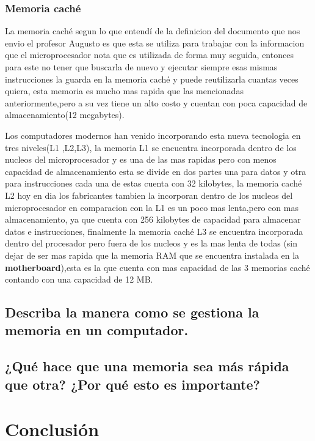 \documentclass{article}
\begin{document}
\subsubsection{Memoria caché}
La memoria caché segun lo que entendí de la definicion del documento que nos envio el profesor Augusto \cite{Augusto} es que esta se utiliza para trabajar con la informacion que el microprocesador nota que es utilizada de forma muy seguida, entonces para este no tener que buscarla de nuevo y ejecutar siempre esas mismas instrucciones la guarda en la memoria caché y puede reutilizarla cuantas veces quiera, esta memoria es mucho mas rapida que las mencionadas anteriormente,pero a su vez tiene un alto costo y cuentan con poca capacidad de almacenamiento(12 megabytes).

\vspace{0.3cm}

Los computadores modernos han venido incorporando esta nueva tecnologia en tres niveles(L1 ,L2,L3), la memoria L1 se encuentra incorporada dentro de los nucleos del microprocesador y es una de las mas rapidas pero con menos capacidad de almacenamiento esta se divide en dos partes una para datos y otra para instrucciones cada una de estas cuenta con 32 kilobytes, la memoria caché L2 hoy en dia los fabricantes tambien la incorporan dentro de los nucleos del microprocesador en comparacion con la L1 es un poco mas lenta,pero con mas almacenamiento, ya que cuenta con 256 kilobytes de capacidad para almacenar datos e instrucciones, finalmente la memoria caché L3 se encuentra incorporada dentro del procesador pero fuera de los nucleos y es la mas lenta de todas (sin dejar de ser mas rapida que la memoria RAM que se encuentra instalada en la \textbf{motherboard}),esta es la que cuenta con mas capacidad de las 3 memorias caché contando con una capacidad de 12 MB. 

\subsection{Describa la manera como se gestiona la memoria en un computador.}

\subsection{¿Qué hace que una memoria sea más rápida que otra? ¿Por qué esto es importante?}

\section{Conclusión} \label{conclulsion}



\end{document}
